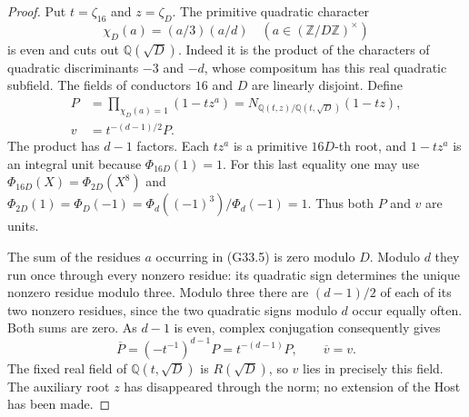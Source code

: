 \begin{proof}
Put $t=\zeta_{16}$ and $z=\zeta_D$.
The primitive quadratic character
\[
        \chi_D(a)=(a/3)(a/d)
                 \quad(a\in(\mathbb Z/D\mathbb Z)^\times)
\]
is even and cuts out $\mathbb Q(\sqrt D)$.
Indeed it is the product of the characters of quadratic
discriminants $-3$ and $-d$, whose compositum has this real
quadratic subfield.  The fields of conductors $16$ and $D$
are linearly disjoint.  Define
\[
 \begin{split}
 P&=\prod_{\chi_D(a)=1}(1-tz^a)
    =N_{\mathbb Q(t,z)/\mathbb Q(t,\sqrt D)}(1-tz),\\
 v&=t^{-(d-1)/2}P.
 \end{split}\tag{G33.5}
\]
The product has $d-1$ factors.  Each $tz^a$ is a primitive
$16D$-th root, and $1-tz^a$ is an integral unit because
$\Phi_{16D}(1)=1$.
For this last equality one may use
$\Phi_{16D}(X)=\Phi_{2D}(X^8)$ and
$\Phi_{2D}(1)=\Phi_D(-1)=\Phi_d((-1)^3)/\Phi_d(-1)=1$.
Thus both $P$ and $v$ are units.

The sum of the residues $a$ occurring in (G33.5) is zero
modulo $D$.  Modulo $d$ they run once through every nonzero
residue: its quadratic sign determines the unique nonzero
residue modulo three.  Modulo three there are $(d-1)/2$
of each of its two nonzero residues, since the two quadratic
signs modulo $d$ occur equally often.  Both sums are zero.
As $d-1$ is even, complex conjugation consequently gives
\[
 \overline P=(-t^{-1})^{d-1}P=t^{-(d-1)}P,
                       \qquad\overline v=v.          \tag{G33.6}
\]
The fixed real field of $\mathbb Q(t,\sqrt D)$ is
$R(\sqrt D)$, so $v$ lies in precisely this field.
The auxiliary root $z$ has disappeared through the norm;
no extension of the Host has been made.


\end{proof}
